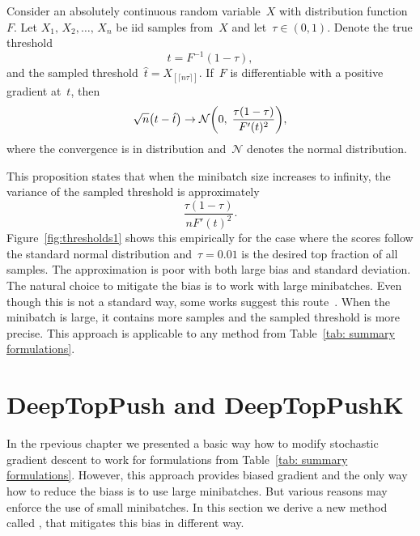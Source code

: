 \begin{proposition}\label{proposition:bound}
  Consider an absolutely continuous random variable~$X$ with distribution function~$F.$ Let $X_1,\, X_2, \ldots, \, X_n$ be iid samples from~$X$ and let~$\tau \in (0,1).$ Denote the true threshold
  \begin{equation*}
    t = F^{-1}(1 - \tau),
  \end{equation*}
  and the sampled threshold~$\hat{t} = X_{[\lceil n\tau\rceil]}$. If~$F$ is differentiable with a positive gradient at~$t$, then
  \begin{equation*}
    \sqrt{n}\Brac{t - \hat{t}} \rightarrow \mathcal{N} \Brac{0, \; \frac{\tau(1-\tau)}{F'(t)^2}},
  \end{equation*}
  where the convergence is in distribution and~$\mathcal{N}$ denotes the normal distribution.
\end{proposition}

This proposition states that when the minibatch size increases to infinity, the variance of the sampled threshold is approximately
\begin{equation*}
  \frac{\tau(1-\tau)}{nF'(t)^2}.
\end{equation*}
Figure~\ref{fig:thresholds1} shows this empirically for the case where the scores follow the standard normal distribution and~$\tau=0.01$ is the desired top fraction of all samples. The approximation is poor with both large bias and standard deviation. The natural choice to mitigate the bias is to work with large minibatches. Even though this is not a standard way, some works suggest this route~\cite{you2019large}. When the minibatch is large, it contains more samples and the sampled threshold is more precise. This approach is applicable to any method from Table~\ref{tab: summary formulations}.

\section{DeepTopPush and DeepTopPushK}

In the rpevious chapter we presented a basic way how to modify stochastic gradient descent to work for formulations from Table~\ref{tab: summary formulations}. However, this approach provides biased gradient and the only way how to reduce the biass is to use large minibatches. But various reasons may enforce the use of small minibatches. In this section we derive a new method called \DeepTopPush, that mitigates this bias in different way.

